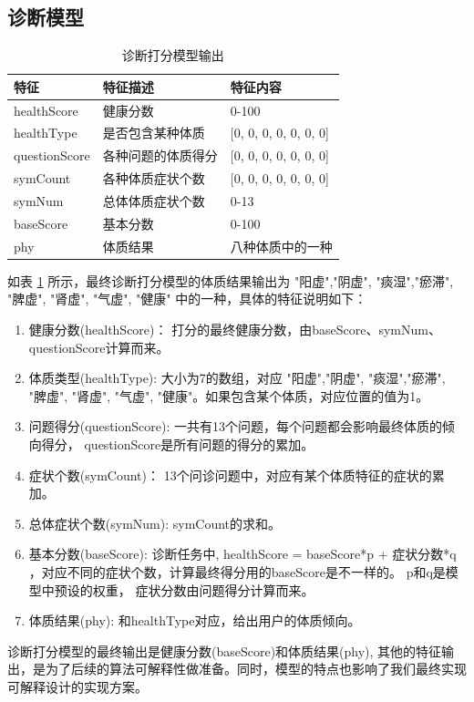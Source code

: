 \subsection{诊断模型}

\begin{table}[h]
    \begin{center}
        \begin{tabular}{lll}
            \toprule
            特征 & 特征描述 & 特征内容 \\ 
            \midrule
            healthScore & 健康分数 & 0-100 \\
            healthType & 是否包含某种体质 & {[}0, 0, 0, 0, 0, 0, 0{]} \\ 
            questionScore & 各种问题的体质得分 & {[}0, 0, 0, 0, 0, 0, 0{]} \\
            symCount & 各种体质症状个数 & {[}0, 0, 0, 0, 0, 0, 0{]} \\
            symNum & 总体体质症状个数 & 0-13 \\
            baseScore & 基本分数 & 0-100 \\
            phy & 体质结果 & 八种体质中的一种\\
            \bottomrule
        \end{tabular}
    \end{center}
    \caption{诊断打分模型输出}
    \label{tab:diag-feature}
\end{table}


如表 \ref{tab:diag-feature} 所示，最终诊断打分模型的体质结果输出为 "阳虚","阴虚", "痰湿","瘀滞", "脾虚", "肾虚", "气虚", "健康" 中的一种，具体的特征说明如下：
\begin{enumerate}
    \item 健康分数(healthScore)： 打分的最终健康分数，由baseScore、symNum、questionScore计算而来。

    \item 体质类型(healthType): 大小为7的数组，对应 "阳虚","阴虚", "痰湿","瘀滞", "脾虚", "肾虚", "气虚", "健康"。如果包含某个体质，对应位置的值为1。

    \item 问题得分(questionScore): 一共有13个问题，每个问题都会影响最终体质的倾向得分， questionScore是所有问题的得分的累加。

    \item 症状个数(symCount)： 13个问诊问题中，对应有某个体质特征的症状的累加。

    \item 总体症状个数(symNum): symCount的求和。

    \item 基本分数(baseScore): 诊断任务中, healthScore = baseScore*p + 症状分数*q ，对应不同的症状个数，计算最终得分用的baseScore是不一样的。 
p和q是模型中预设的权重， 症状分数由问题得分计算而来。

    \item 体质结果(phy): 和healthType对应，给出用户的体质倾向。
\end{enumerate}
诊断打分模型的最终输出是健康分数(baseScore)和体质结果(phy), 其他的特征输出，是为了后续的算法可解释性做准备。同时，模型的特点也影响了我们最终实现可解释设计的实现方案。


